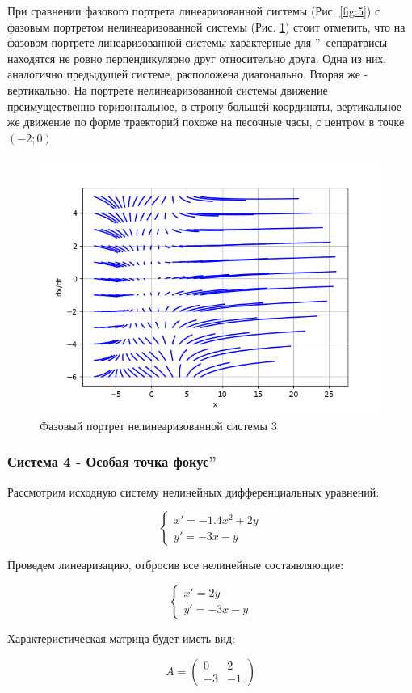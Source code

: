 При сравнении фазового портрета линеаризованной системы (Рис. \ref{fig:5}) с фазовым портретом нелинеаризованной системы
(Рис. \ref{fig:6}) стоит отметить, что на фазовом портрете линеаризованной системы характерные для \textquotedblright\ сепаратрисы находятся не ровно перпендикулярно друг относительно друга.
Одна из них, аналогично предыдущей системе, расположена диагонально. Вторая же - вертикально.
На портрете нелинеаризованной системы движение преимущественно горизонтальное, в строну большей координаты,
вертикальное же движение по форме траекторий похоже на песочные часы, с центром в точке $(-2;0)$

\begin{figure}[H]
	\centering
	\includegraphics[width=0.6\linewidth]{body/images/System-3.png}
	\caption{Фазовый портрет нелинеаризованной системы 3}
	\label{fig:6}
\end{figure}

\subsubsection{Система 4 - Особая точка  фокус\textquotedblright}

Рассмотрим исходную систему нелинейных дифференциальных уравнений:

$$
\begin{cases}
x' = - 1.4x^2 + 2y\\
y' = -3x - y
\end{cases}
$$

Проведем линеаризацию, отбросив все нелинейные состаявляющие:

$$
\begin{cases}
	x' = 2y\\
	y' = -3x - y
\end{cases}
$$

Характеристическая матрица будет иметь вид:

$$
A = 
\begin{pmatrix}
	0 & 2 \\
	-3 & -1
\end{pmatrix}
$$

